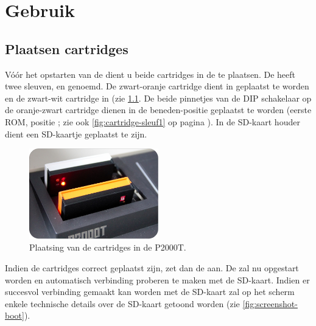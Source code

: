 \chapter{Gebruik}
\chapterpreamble

\label{chap:usage}

%
%
%
\section{Plaatsen cartridges}

Vóór het opstarten van de  dient u beide cartridges in de  te plaatsen. De  heeft twee sleuven,  en  genoemd. De zwart-oranje cartridge dient in  geplaatst te worden en de zwart-wit cartridge in  (zie \cref{fig:placement-cartridges}. De beide pinnetjes van de DIP schakelaar op de oranje-zwart cartridge dienen in de beneden-positie geplaatst te worden (eerste ROM, positie ; zie ook \cref{fig:cartridge-sleuf1} op pagina \pageref{fig:cartridge-sleuf1}). In de SD-kaart houder dient een SD-kaartje geplaatst te zijn.

\begin{figure}[h!]
    \centering
    \includegraphics[width=0.50\textwidth]{img/placement-cartridges.png}
    \caption{Plaatsing van de cartridges in de P2000T.}
    \label{fig:placement-cartridges}
\end{figure}

Indien de cartridges correct geplaatst zijn, zet dan de  aan. De \launcher zal nu opgestart worden en automatisch verbinding proberen te maken met de SD-kaart. Indien er succesvol verbinding gemaakt kan worden met de SD-kaart zal op het scherm enkele technische details over de SD-kaart getoond worden (zie \cref{fig:screenshot-boot}).


